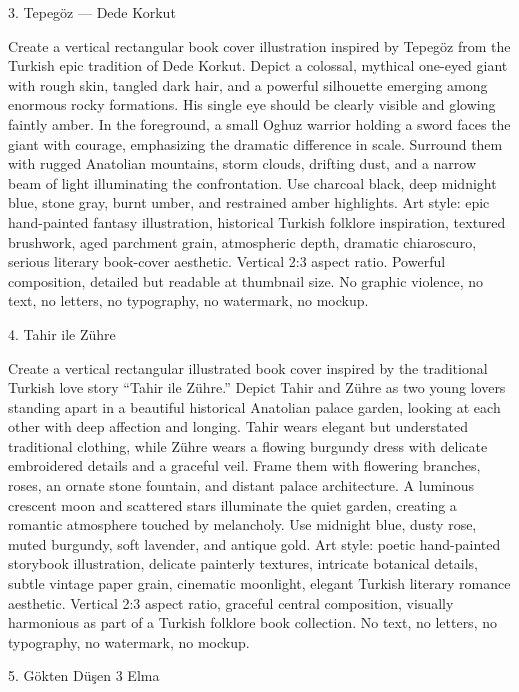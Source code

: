 \documentclass[12pt,a4paper]{article}
\begin{document}
3. Tepegöz — Dede Korkut
 
Create a vertical rectangular book cover illustration inspired by Tepegöz from the Turkish epic tradition of Dede Korkut. Depict a colossal, mythical one-eyed giant with rough skin, tangled dark hair, and a powerful silhouette emerging among enormous rocky formations. His single eye should be clearly visible and glowing faintly amber. In the foreground, a small Oghuz warrior holding a sword faces the giant with courage, emphasizing the dramatic difference in scale. Surround them with rugged Anatolian mountains, storm clouds, drifting dust, and a narrow beam of light illuminating the confrontation. Use charcoal black, deep midnight blue, stone gray, burnt umber, and restrained amber highlights. Art style: epic hand-painted fantasy illustration, historical Turkish folklore inspiration, textured brushwork, aged parchment grain, atmospheric depth, dramatic chiaroscuro, serious literary book-cover aesthetic. Vertical 2:3 aspect ratio. Powerful composition, detailed but readable at thumbnail size. No graphic violence, no text, no letters, no typography, no watermark, no mockup.

4. Tahir ile Zühre
 
Create a vertical rectangular illustrated book cover inspired by the traditional Turkish love story “Tahir ile Zühre.” Depict Tahir and Zühre as two young lovers standing apart in a beautiful historical Anatolian palace garden, looking at each other with deep affection and longing. Tahir wears elegant but understated traditional clothing, while Zühre wears a flowing burgundy dress with delicate embroidered details and a graceful veil. Frame them with flowering branches, roses, an ornate stone fountain, and distant palace architecture. A luminous crescent moon and scattered stars illuminate the quiet garden, creating a romantic atmosphere touched by melancholy. Use midnight blue, dusty rose, muted burgundy, soft lavender, and antique gold. Art style: poetic hand-painted storybook illustration, delicate painterly textures, intricate botanical details, subtle vintage paper grain, cinematic moonlight, elegant Turkish literary romance aesthetic. Vertical 2:3 aspect ratio, graceful central composition, visually harmonious as part of a Turkish folklore book collection. No text, no letters, no typography, no watermark, no mockup.

5. Gökten Düşen 3 Elma
  
\end{document}
